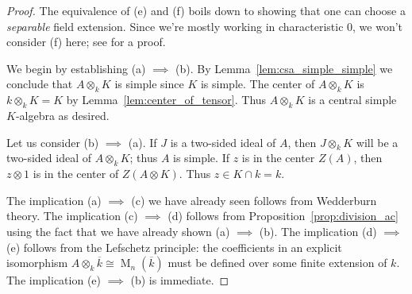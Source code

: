 \documentclass[12pt]{article}
\theoremstyle{plain}
\theoremstyle{definition}
\theoremstyle{remark}
\numberwithin{equation}{section}
\begin{document}
\begin{proof}
The equivalence of (e) and (f) boils down to showing that one can choose
a \emph{separable} field extension.
Since we're mostly working in
characteristic $0$, we won't consider (f) here;
see \cite[Proposition 2.2.5]{GS} for a proof.

We begin by establishing (a) $\implies$ (b).
By Lemma~\ref{lem:csa_simple_simple} we conclude that $A \otimes_k K$
is simple since $K$ is simple.  The center of $A \otimes_k K$
is $k \otimes_k K=K$ by Lemma~\ref{lem:center_of_tensor}.
Thus $A \otimes_k K$ is a central simple $K$-algebra as desired.

Let us consider (b) $\implies$ (a).
If $J$ is a two-sided ideal of $A$, then $J \otimes_k K$ will be a
two-sided ideal of $A \otimes_k K$; thus $A$ is simple.
If $z$ is in the center $Z(A)$, then $z \otimes 1$ is in the
center of $Z(A \otimes K)$.  Thus $z \in K \cap k = k$.

The implication (a) $\implies$ (c) we have already seen follows from
Wedderburn theory.
The implication (c) $\implies$ (d) follows from
Proposition~\ref{prop:division_ac}
using the fact that we have already shown (a) $\implies$ (b).
The implication (d) $\implies$ (e) follows from the Lefschetz principle:
the coefficients in an explicit isomorphism
$A \otimes_k \overline{k} \cong \operatorname{M}_n(\overline{k})$
must be defined over some finite extension of $k$.
The implication (e) $\implies$ (b) is immediate.
\end{proof}



\end{document}
